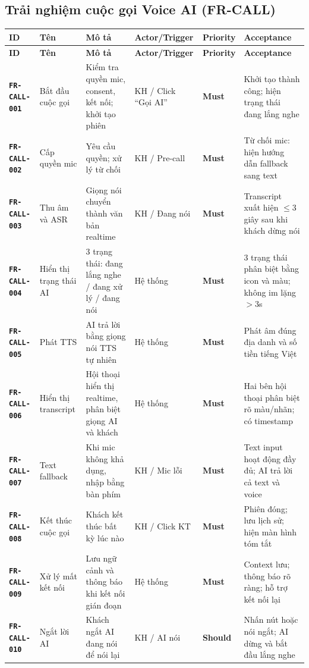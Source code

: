 \documentclass[12pt,a4paper]{article}
\newcommand{\reqid}[1]{\texttt{\textbf{\color{AloBlue}#1}}}
\newcommand{\musthave}{\colorbox{PrioMust}{\small\textbf{Must}}}
\newcommand{\shouldhave}{\colorbox{PrioShould}{\small\textbf{Should}}}
\begin{document}
\subsection{Trải nghiệm cuộc gọi Voice AI (FR-CALL)}
\begin{longtable}{L{2.2cm} L{2cm} L{3.8cm} L{3cm} C{1.5cm} L{3cm}}
  \toprule{}\textbf{ID}&\textbf{Tên}&\textbf{Mô tả}&\textbf{Actor/Trigger}&\textbf{Priority}&\textbf{Acceptance}\\
  \midrule\endfirsthead\toprule{}\textbf{ID}&\textbf{Tên}&\textbf{Mô tả}&\textbf{Actor/Trigger}&\textbf{Priority}&\textbf{Acceptance}\\\midrule\endhead\bottomrule\endlastfoot
  \reqid{FR-CALL-001} & Bắt đầu cuộc gọi & Kiểm tra quyền mic, consent, kết nối; khởi tạo phiên & KH / Click ``Gọi AI'' & \musthave & Khởi tạo thành công; hiện trạng thái đang lắng nghe \\
  \reqid{FR-CALL-002} & Cấp quyền mic & Yêu cầu quyền; xử lý từ chối & KH / Pre-call & \musthave & Từ chối mic: hiện hướng dẫn fallback sang text \\
  \reqid{FR-CALL-003} & Thu âm và ASR & Giọng nói chuyển thành văn bản realtime & KH / Đang nói & \musthave & Transcript xuất hiện $\leq$3 giây sau khi khách dừng nói \\
  \reqid{FR-CALL-004} & Hiển thị trạng thái AI & 3 trạng thái: đang lắng nghe / đang xử lý / đang nói & Hệ thống & \musthave & 3 trạng thái phân biệt bằng icon và màu; không im lặng $>$3s \\
  \reqid{FR-CALL-005} & Phát TTS & AI trả lời bằng giọng nói TTS tự nhiên & Hệ thống & \musthave & Phát âm đúng địa danh và số tiền tiếng Việt \\
  \reqid{FR-CALL-006} & Hiển thị transcript & Hội thoại hiển thị realtime, phân biệt giọng AI và khách & Hệ thống & \musthave & Hai bên hội thoại phân biệt rõ màu/nhãn; có timestamp \\
  \reqid{FR-CALL-007} & Text fallback & Khi mic không khả dụng, nhập bằng bàn phím & KH / Mic lỗi & \musthave & Text input hoạt động đầy đủ; AI trả lời cả text và voice \\
  \reqid{FR-CALL-008} & Kết thúc cuộc gọi & Khách kết thúc bất kỳ lúc nào & KH / Click KT & \musthave & Phiên đóng; lưu lịch sử; hiện màn hình tóm tắt \\
  \reqid{FR-CALL-009} & Xử lý mất kết nối & Lưu ngữ cảnh và thông báo khi kết nối gián đoạn & Hệ thống & \musthave & Context lưu; thông báo rõ ràng; hỗ trợ kết nối lại \\
  \reqid{FR-CALL-010} & Ngắt lời AI & Khách ngắt AI đang nói để nói lại & KH / AI nói & \shouldhave & Nhấn nút hoặc nói ngắt; AI dừng và bắt đầu lắng nghe \\
\end{longtable}
\end{document}
